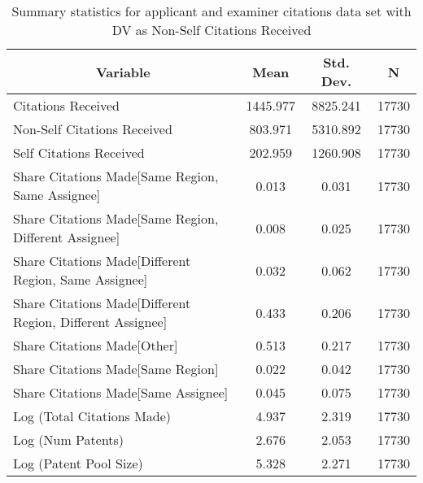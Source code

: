 
\begin{table}[htbp]\centering \caption{Summary statistics for applicant and examiner citations  data set with DV as Non-Self Citations Received \label{ae.nsummary}}
\scriptsize
\singlespacing
\begin{tabular}{l c c  c}\hline\hline
\multicolumn{1}{c}{\textbf{Variable}} & \textbf{Mean}
 & \textbf{Std. Dev.} & \textbf{N}\\ \hline
Citations Received & 1445.977 & 8825.241  & 17730\\
Non-Self Citations Received & 803.971 & 5310.892  & 17730\\
Self Citations Received & 202.959 & 1260.908  & 17730\\
Share Citations Made[Same Region, Same Assignee] & 0.013 & 0.031  & 17730\\
Share Citations Made[Same Region, Different Assignee] & 0.008 & 0.025  & 17730\\
Share Citations Made[Different Region, Same Assignee] & 0.032 & 0.062  & 17730\\
Share Citations Made[Different Region, Different Assignee] & 0.433 & 0.206  & 17730\\
Share Citations Made[Other] & 0.513 & 0.217  & 17730\\
Share Citations Made[Same Region] & 0.022 & 0.042  & 17730\\
Share Citations Made[Same Assignee] & 0.045 & 0.075  & 17730\\
Log (Total Citations Made) & 4.937 & 2.319  & 17730\\
Log (Num Patents) & 2.676 & 2.053  & 17730\\
Log (Patent Pool Size) & 5.328 & 2.271  & 17730\\
\hline\end{tabular}
\end{table}
